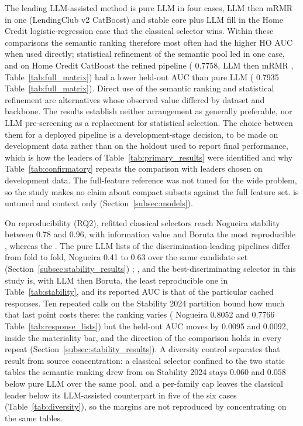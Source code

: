 \documentclass[final,5p,twocolumn]{elsarticle}
\providecommand{\DIFaddtex}[1]{{\protect\color{blue} \sf #1}} %
\providecommand{\DIFdeltex}[1]{{\protect\color{red} \scriptsize #1}} %
\providecommand{\DIFaddbegin}{} %
\providecommand{\DIFaddend}{} %
\providecommand{\DIFdelbegin}{} %
\providecommand{\DIFdelend}{} %
\providecommand{\DIFadd}[1]{\texorpdfstring{\DIFaddtex{#1}}{#1}} %
\providecommand{\DIFdel}[1]{\texorpdfstring{\DIFdeltex{#1}}{}} %
\begin{document}
\DIFaddend The leading LLM-assisted method is pure LLM in four cases, LLM then mRMR in one (LendingClub v2 CatBoost) and stable core plus LLM fill in the Home Credit logistic-regression case that the classical selector wins. Within these comparisons the semantic ranking therefore most often had the higher HO AUC when used directly; statistical refinement of the semantic pool led in one case, and on Home Credit CatBoost the refined pipeline (\DIFdelbegin \DIFdel{0.7758, }\DIFdelend LLM then mRMR\DIFdelbegin \DIFdel{, Table~\ref{tab:full_matrix}}\DIFdelend ) had a lower held-out AUC than pure LLM (\DIFdelbegin \DIFdel{0.7935}\DIFdelend \DIFaddbegin \DIFadd{Table~\ref{tab:full_matrix}}\DIFaddend ). Direct use of the semantic ranking and statistical refinement are alternatives whose observed value differed by dataset and backbone. The results establish neither arrangement as generally preferable, nor LLM pre-screening as a replacement for statistical selection. The choice between them for a deployed pipeline is a development-stage decision, to be made on development data rather than on the holdout used to report final performance, which is how the leaders of Table~\ref{tab:primary_results} were identified and why Table~\ref{tab:confirmatory} repeats the comparison with leaders chosen on development data. The full-feature reference \DIFdelbegin \DIFdel{was not tuned for the wide problem, so the study makes no claim about compact subsets against the full feature set.
}\DIFdelend \DIFaddbegin \DIFadd{is untuned and context only (Section~\ref{subsec:models}).
}

\DIFaddend On reproducibility (RQ2), refitted classical selectors reach Nogueira stability between 0.78 and 0.96, with information value and Boruta the most reproducible\DIFdelbegin \DIFdel{, whereas the }\DIFdelend \DIFaddbegin \DIFadd{. The }\DIFaddend pure LLM lists of the discrimination-leading pipelines differ from fold to fold, Nogueira 0.41 to 0.63 over the same candidate set (Section~\ref{subsec:stability_results})\DIFdelbegin \DIFdel{; }\DIFdelend \DIFaddbegin \DIFadd{, and }\DIFaddend the best-discriminating selector in this study is, with LLM then Boruta, the least reproducible one in Table~\ref{tab:stability}, and its reported AUC is that of the particular cached responses. Ten repeated calls on the Stability 2024 partition bound how much that last point costs there: the ranking varies (\DIFdelbegin \DIFdel{Nogueira 0.8052 and 0.7766}\DIFdelend \DIFaddbegin \DIFadd{Table~\ref{tab:response_lists}}\DIFaddend ) but the held-out AUC moves by 0.0095 and 0.0092, inside the materiality bar, and the direction of the comparison holds in every repeat (Section~\ref{subsec:stability_results}). A diversity control separates that result from source concentration: a classical selector confined to the two static tables the semantic ranking drew from on Stability 2024 stays $0.060$ and $0.058$ below pure LLM over the same pool, and a per-family cap leaves the classical leader below its LLM-assisted counterpart in five of the six cases (Table~\ref{tab:diversity}), so the margins are not reproduced by concentrating on the same tables.
\end{document}
